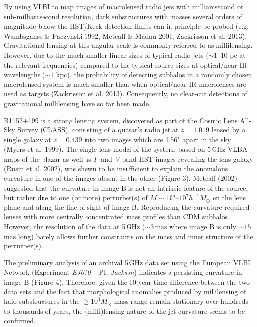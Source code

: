 \documentclass[a4paper, 11pt]{article}
\begin{document}
By using VLBI to map images of macrolensed radio jets with milliarcsecond or sub-milliarcsecond resolution, dark substructures with masses several orders of magnitude below the HST/Keck detection limits can in principle be probed (e.g. Wambsganss \& Paczynski 1992, Metcalf \& Madau 2001, Zackrisson et al. 2013). Gravitational lensing at this angular scale is commonly referred to as millilensing. However, due to the much smaller linear sizes of typical radio jets ($\sim 1$--$10$ pc at the relevant frequencies) compared to the typical source sizes at optical/near-IR wavelengths ($\sim 1$ kpc), the probability of detecting subhalos in a randomly chosen macrolensed system is much smaller than when optical/near-IR macrolenses are used as targets (Zackrisson et al. 2013). Consequently, no clear-cut detections of gravitational millilensing have so far been made.

B1152+199 is a strong lensing system, discovered as part of the Cosmic Lens All-Sky Survey (CLASS), consisting of a quasar's radio jet at $z = 1.019$ lensed by a single galaxy at $z = 0.439$ into two images which are 1.56" apart in the sky (Myers et al. 1999). 
The single-lens model of the system, based on 5\,GHz VLBA maps of the blazar as well as {\it I}- and {\it V}-band HST images revealing the lens galaxy (Rusin et al. 2002), was shown to be insufficient to explain the anomalous curvature in one of the images absent in the other (Figure 3). Metcalf (2002) suggested that the curvature in image B is not an intrinsic feature of the source, but rather due to one (or more) perturber(s) of $M\sim10^5$--$10^7 h^{-1} M_\odot$ on the lens plane and along the line of sight of image B. Reproducing the curvature required lenses with more centrally concentrated mass profiles than CDM subhalos. However, the resolution of the data at 5\,GHz ($\sim3$\,mas where image B is only $\sim15$\,mas long) barely allows further constraints on the mass and inner structure of the perturber(s). 

The preliminary analysis of an archival 5\,GHz data set using the European VLBI Network (Experiment \emph{EJ010} -- PI. \emph{Jackson}) indicates a persisting curvature in image B (Figure 4). Therefore, given the 10-year time difference between the two data sets and the fact that morphological anomalies produced by millilensing of halo substructures in the $\geq 10^4 M_\odot$ mass range remain stationary over hundreds to thousands of years, the (milli)lensing nature of the jet curvature seems to be confirmed. 
\end{document}

